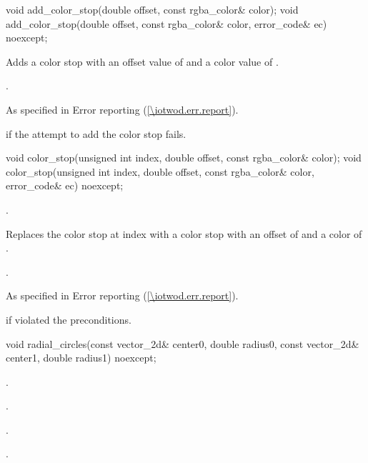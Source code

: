 \begin{itemdecl}
    void add_color_stop(double offset, const rgba_color& color);
    void add_color_stop(double offset, const rgba_color& color,
      error_code& ec) noexcept;
\end{itemdecl}
\begin{itemdescr}
	\pnum
	\effects
	Adds a color stop with an offset value of  and a color value of .
	
	\pnum
	\postconditions
	.
	
	\pnum
	\throws
	As specified in Error reporting (\ref{\iotwod.err.report}).
	
	\pnum
	\errors
	 if the attempt to add the color stop fails.
	
\end{itemdescr}

\begin{itemdecl}
    void color_stop(unsigned int index, double offset, const rgba_color& color);
    void color_stop(unsigned int index, double offset, const rgba_color& color,
      error_code& ec) noexcept;
\end{itemdecl}
\begin{itemdescr}
	\pnum
	\requires
	.
	
	\pnum
	\effects
	Replaces the color stop at index  with a color stop with an offset of  and a color of .

	\pnum
	\postconditions
	.
	
	\pnum
	\throws
	As specified in Error reporting (\ref{\iotwod.err.report}).
	
	\pnum
	\errors
	 if  violated the preconditions.

\end{itemdescr}

\begin{itemdecl}
    void radial_circles(const vector_2d& center0, double radius0,
      const vector_2d& center1, double radius1) noexcept;
\end{itemdecl}
\begin{itemdescr}
	\pnum
	\postconditions
	.
	
	\pnum
	.
	
	\pnum
	.

	\pnum
	.

\end{itemdescr}

